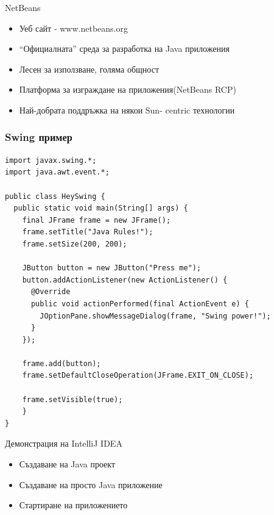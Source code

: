 \documentclass{beamer}
\begin{document}
\begin{frame}{NetBeans}
  \transdissolve  
  \begin{itemize}
    \item Уеб сайт - www.netbeans.org
    \item “Официалната” среда за разработка на
    Java приложения
    \item Лесен за използване, голяма общност
    \item Платформа за изграждане на приложения(NetBeans RCP)
    \item Най-добрата поддръжка на някои Sun-
    centric технологии
  \end{itemize}
\end{frame}

\begin{frame}[fragile]
  \frametitle{Swing пример}
  \transdissolve
\begin{lstlisting}[basicstyle=\tiny]
import javax.swing.*;
import java.awt.event.*;

public class HeySwing {
  public static void main(String[] args) {
    final JFrame frame = new JFrame();
    frame.setTitle("Java Rules!");
    frame.setSize(200, 200);

    JButton button = new JButton("Press me");
    button.addActionListener(new ActionListener() {
      @Override
      public void actionPerformed(final ActionEvent e) {
        JOptionPane.showMessageDialog(frame, "Swing power!");
      }
    });

    frame.add(button);
    frame.setDefaultCloseOperation(JFrame.EXIT_ON_CLOSE);

    frame.setVisible(true);
    }
}
\end{lstlisting}
\end{frame}

\begin{frame}{Демонстрация на IntelliJ IDEA}
  \transdissolve
  \begin{itemize}
    \item Създаване на Java проект
    \item Създаване на просто Java приложение
    \item Стартиране на приложението
  \end{itemize}
\end{frame}
\end{document}
